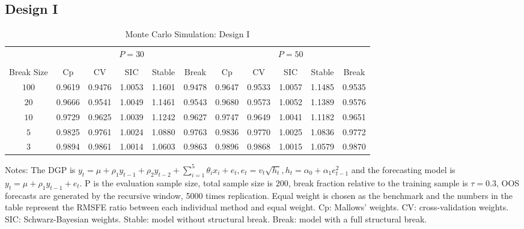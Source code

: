 \subsection{Design I}
\begin{table}
    \caption{Monte Carlo Simulation: Design I} \label{ntb:1}
    \centering
    \begin{adjustbox}{width=\textwidth,totalheight=\textheight,keepaspectratio}
    \begin{threeparttable}
    \begin{tabular}{ccccccccccc}
    \toprule
     & \multicolumn{5}{c}{$P = 30$} & \multicolumn{5}{c}{$P = 50$} \\
    \cmidrule(r){2-6}
    \cmidrule(r){7-11} \\
      Break Size   & Cp     &   CV   & SIC    & Stable & Break  & Cp     & CV     & SIC    & Stable & Break \\
             $100$ & 0.9619 & 0.9476 & 1.0053 & 1.1601 & 0.9478 & 0.9647 & 0.9533 & 1.0057 & 1.1485 & 0.9535 \\
             $20$  & 0.9666 & 0.9541 & 1.0049 & 1.1461 & 0.9543 & 0.9680 & 0.9573 & 1.0052 & 1.1389 & 0.9576 \\
             $10$  & 0.9729 & 0.9625 & 1.0039 & 1.1242 & 0.9627 & 0.9747 & 0.9649 & 1.0041 & 1.1182 & 0.9651 \\
             $5$   & 0.9825 & 0.9761 & 1.0024 & 1.0880 & 0.9763 & 0.9836 & 0.9770 & 1.0025 & 1.0836 & 0.9772 \\
             $3$   & 0.9894 & 0.9861 & 1.0014 & 1.0603 & 0.9863 & 0.9896 & 0.9868 & 1.0015 & 1.0579 & 0.9870 \\
    \bottomrule
    \end{tabular}
    \begin{tablenotes} \footnotesize
    Notes: The DGP is $y_{t} = \mu + \rho_{1}y_{t-1} + \rho_{2}y_{t-2} + \sum_{i=1}^{5}\theta_{i}x_{i} + e_{t}, e_{t} = v_{t}\sqrt{h_{t}}, h_{t} = \alpha_{0} + \alpha_{1}e_{t-1}^2$ and the forecasting model is $y_{t} = \mu + \rho_{1}y_{t-1} + e_{t}$. $\mathrm{P}$ is the evaluation sample size, total sample size is $200$, break fraction relative to the training sample is $\tau = 0.3$, OOS forecasts are generated by the recursive window, 5000 times replication. Equal weight is chosen as the benchmark and the numbers in the table represent the RMSFE ratio between each individual method and equal weight. Cp: Mallows' weights. CV: cross-validation weights. SIC: Schwarz-Bayesian weights. Stable: model without structural break. Break: model with a full structural break.
    \end{tablenotes}
    \end{threeparttable}
    \end{adjustbox}
\end{table}
